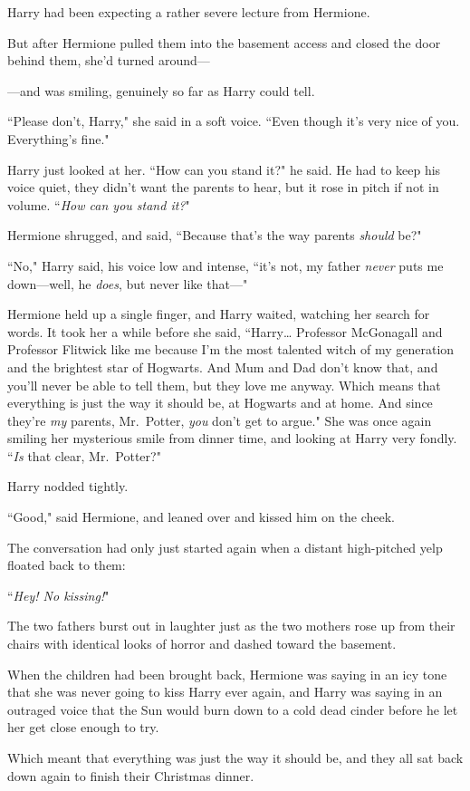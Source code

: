 Harry had been expecting a rather severe lecture from Hermione.

But after Hermione pulled them into the basement access and closed the door behind them, she'd turned around---

---and was smiling, genuinely so far as Harry could tell.

``Please don't, Harry," she said in a soft voice. ``Even though it's very nice of you. Everything's fine."

Harry just looked at her. ``How can you stand it?" he said. He had to keep his voice quiet, they didn't want the parents to hear, but it rose in pitch if not in volume. ``\emph{How can you stand it?}"

Hermione shrugged, and said, ``Because that's the way parents \emph{should} be?"

``No," Harry said, his voice low and intense, ``it's not, my father \emph{never} puts me down---well, he \emph{does}, but never like that---"

Hermione held up a single finger, and Harry waited, watching her search for words. It took her a while before she said, ``Harry{\ldots} Professor McGonagall and Professor Flitwick like me because I'm the most talented witch of my generation and the brightest star of Hogwarts. And Mum and Dad don't know that, and you'll never be able to tell them, but they love me anyway. Which means that everything is just the way it should be, at Hogwarts and at home. And since they're \emph{my} parents, Mr.~Potter, \emph{you} don't get to argue." She was once again smiling her mysterious smile from dinner time, and looking at Harry very fondly. ``\emph{Is} that clear, Mr.~Potter?"

Harry nodded tightly.

``Good," said Hermione, and leaned over and kissed him on the cheek.

\later

The conversation had only just started again when a distant high-pitched yelp floated back to them:

``\emph{Hey! No kissing!}"

The two fathers burst out in laughter just as the two mothers rose up from their chairs with identical looks of horror and dashed toward the basement.

When the children had been brought back, Hermione was saying in an icy tone that she was never going to kiss Harry ever again, and Harry was saying in an outraged voice that the Sun would burn down to a cold dead cinder before he let her get close enough to try.

Which meant that everything was just the way it should be, and they all sat back down again to finish their Christmas dinner.

